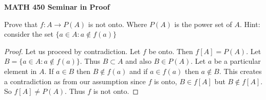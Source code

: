 \documentclass[14pt, fullpage]{article}
\begin{document}
\begin{center}
		
{\bf MATH 450 Seminar in Proof}
 \\
\end{center}
	Prove that $f:A \rightarrow P(A)$ is not onto. Where $P(A)$ is the power set of $A$. Hint: consider the set $\{a \in A: a \notin f(a)\}$
\begin{proof}
	Let us proceed by contradiction. Let $f$ be onto. Then $f[A] = P(A)$. Let $B = \{a \in A: a \notin f(a)\}$. Thus $B \subset A$ and also $B \in P(A)$. Let $a$ be a particular element in $A$. If $a \in B$ then $B \notin f(a)$ and if $a \in f(a)$ then $a \notin B$. This creates a contradiction as from our assumption since $f$ is onto, $B \in f[A]$ but $B \notin f[A]$. So $f[A] \neq P(A)$. Thus $f$ is not onto.
\end{proof}
\end{document}
